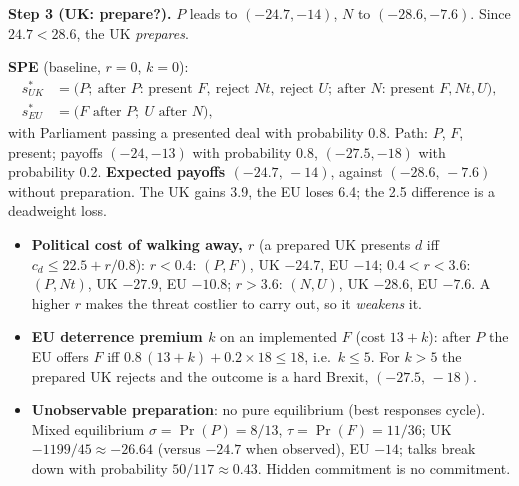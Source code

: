 \documentclass[10pt,a4paper]{article}
\newcommand{\Nt}{\mathit{Nt}}
\newcommand{\dF}{\mathit{F}}
\newcommand{\dU}{\mathit{U}}
\begin{document}
\textbf{Step 3 (UK: prepare?).} $P$ leads to $(-24.7,-14)$, $N$ to $(-28.6,-7.6)$. Since $24.7<28.6$, the UK \emph{prepares}.

\begin{tcolorbox}[colback=ans!5,colframe=ans,boxrule=0.6pt,left=5pt,right=5pt,top=3pt,bottom=3pt]
\textbf{SPE} (baseline, $r=0$, $k=0$):
\begin{align*}
  s^*_{UK} &= \bigl(P;\ \text{after }P\text{: present }\dF,\ \text{reject }\Nt,\ \text{reject }\dU;\
              \text{after }N\text{: present }\dF,\Nt,\dU\bigr),\\
  s^*_{EU} &= \bigl(\dF\text{ after }P;\ \dU\text{ after }N\bigr),
\end{align*}
with Parliament passing a presented deal with probability 0.8. Path: $P$, $\dF$, present; payoffs
$(-24,-13)$ with probability 0.8, $(-27.5,-18)$ with probability 0.2. \textbf{Expected payoffs
$(-24.7,\,-14)$}, against $(-28.6,\,-7.6)$ without preparation. The UK gains 3.9, the EU loses 6.4;
the 2.5 difference is a deadweight loss.
\end{tcolorbox}

\begin{tcolorbox}[colback=src!4,colframe=src,boxrule=0.5pt,left=5pt,right=5pt,top=3pt,bottom=3pt,
  title={Key comparative statics}]
\begin{itemize}[leftmargin=1.2em]
  \item \textbf{Political cost of walking away, $r$} (a prepared UK presents $d$ iff $c_d\le22.5+r/0.8$):
    $r<0.4$: $(P,\dF)$, UK $-24.7$, EU $-14$;\quad
    $0.4<r<3.6$: $(P,\Nt)$, UK $-27.9$, EU $-10.8$;\quad
    $r>3.6$: $(N,\dU)$, UK $-28.6$, EU $-7.6$.
    A higher $r$ makes the threat costlier to carry out, so it \emph{weakens} it.
  \item \textbf{EU deterrence premium $k$} on an implemented $\dF$ (cost $13+k$): after $P$ the EU
    offers $\dF$ iff $0.8\,(13+k)+0.2\times18\le18$, i.e.\ $k\le5$. For $k>5$ the prepared UK
    rejects and the outcome is a hard Brexit, $(-27.5,\,-18)$.
  \item \textbf{Unobservable preparation}: no pure equilibrium (best responses cycle). Mixed
    equilibrium $\sigma=\Pr(P)=8/13$, $\tau=\Pr(\dF)=11/36$; UK $-1199/45\approx-26.64$ (versus
    $-24.7$ when observed), EU $-14$; talks break down with probability $50/117\approx0.43$.
    Hidden commitment is no commitment.
\end{itemize}
\end{tcolorbox}
\end{document}
